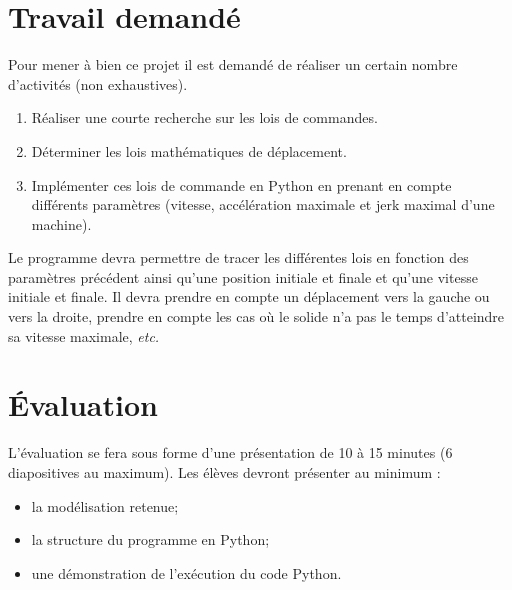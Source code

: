\documentclass[10pt]{article}
\begin{document}
\section{Travail demandé}
Pour mener à bien ce projet il est demandé de réaliser un certain nombre d'activités (non exhaustives).
\begin{enumerate}
\item Réaliser une courte recherche sur les lois de commandes. 
\item Déterminer les lois mathématiques de déplacement.
\item Implémenter ces lois de commande en Python en prenant en compte différents paramètres (vitesse, accélération maximale et jerk maximal d'une machine).
\end{enumerate}

Le programme devra permettre de tracer les différentes lois en fonction des paramètres précédent ainsi qu'une position initiale et finale et qu'une vitesse initiale et finale. Il devra prendre en compte un déplacement vers la gauche ou vers la droite, prendre en compte les cas où le solide n'a pas le temps d'atteindre sa vitesse maximale, \textit{etc.}




\section{Évaluation}
L'évaluation se fera sous forme d'une présentation de 10 à 15 minutes (6 diapositives au maximum). Les élèves devront présenter au minimum : 
\begin{itemize}
\item la modélisation retenue;
\item la structure du programme en Python;
\item une démonstration de l'exécution du code Python.
\end{itemize}
\end{document}
